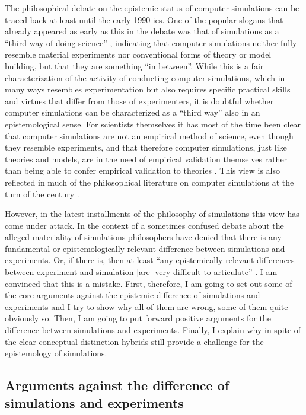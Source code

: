\documentclass[12pt, a4paper]{article}
\numberwithin{equation}{section}
\begin{document}
The philosophical debate on the epistemic status of computer simulations can be traced back at least until the early 1990-ies. One of the popular slogans that already appeared as early as this in the debate was that of simulations as a ``third way of doing science'' \citep{rohrlich:1990, axelrod:2003, kueppers-lenhard:2005}, indicating that computer simulations neither fully resemble material experiments nor conventional forms of theory or model building, but that they are something ``in between''. While this is a fair characterization of the activity of conducting computer simulations, which in many ways resembles experimentation but also requires specific practical skills and virtues that differ from those of experimenters, it is doubtful whether computer simulations can be characterized as a ``third way'' also in an epistemological sense. For scientists themselves it has most of the time been clear that computer simulations are not an empirical method of science, even though they resemble experiments, and that therefore computer simulations, just like theories and models, are in the need of empirical validation themselves rather than being able to confer empirical validation to theories \citep{gilbert-troitzsch:2005, heath-et-al:2009}. This view is also reflected in much of the philosophical literature on computer simulations at the turn of the century \citep{guala:2002, morgan:2003, humphreys:2004}.

However, in the latest installments of the philosophy of simulations this view has come under attack. In the context of a sometimes confused debate about the alleged materiality of simulations philosophers have denied that there is any fundamental or epistemologically relevant difference between simulations and experiments. Or, if there is, then at least ``any epistemically relevant differences between experiment and simulation [are] very difficult to articulate'' \citep[p.\ 48]{morrison:2009}. I am convinced that this is a mistake. First, therefore, I am going to set out some of the core arguments against the epistemic difference of simulations and experiments and I try to show why all of them are wrong, some of them quite obviously so. Then, I am going to put forward positive arguments for the difference between simulations and experiments. Finally, I explain why in spite of the clear conceptual distinction hybrids still provide a challenge for the epistemology of simulations.

\subsection{Arguments against the difference of simulations and experiments}
\end{document}
